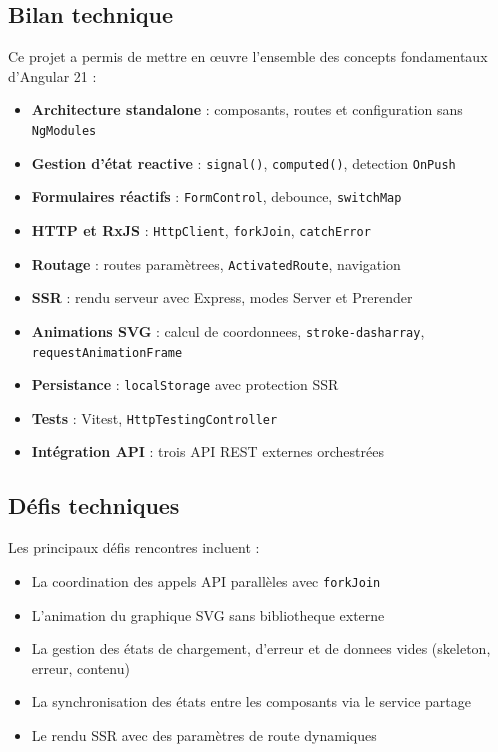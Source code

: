 \documentclass[12pt,a4paper]{article}
\begin{document}
\subsection{Bilan technique}

Ce projet a permis de mettre en œuvre l'ensemble des concepts fondamentaux d'Angular 21 :

\begin{itemize}[nosep]
    \item \textbf{Architecture standalone} : composants, routes et configuration sans \texttt{NgModules}
    \item \textbf{Gestion d'état reactive} : \texttt{signal()}, \texttt{computed()}, detection \texttt{OnPush}
    \item \textbf{Formulaires réactifs} : \texttt{FormControl}, debounce, \texttt{switchMap}
    \item \textbf{HTTP et RxJS} : \texttt{HttpClient}, \texttt{forkJoin}, \texttt{catchError}
    \item \textbf{Routage} : routes paramètrees, \texttt{ActivatedRoute}, navigation
    \item \textbf{SSR} : rendu serveur avec Express, modes Server et Prerender
    \item \textbf{Animations SVG} : calcul de coordonnees, \texttt{stroke-dasharray}, \texttt{requestAnimationFrame}
    \item \textbf{Persistance} : \texttt{localStorage} avec protection SSR
    \item \textbf{Tests} : Vitest, \texttt{HttpTestingController}
    \item \textbf{Intégration API} : trois API REST externes orchestrées
\end{itemize}

\subsection{Défis techniques}

Les principaux défis rencontres incluent :
\begin{itemize}[nosep]
    \item La coordination des appels API parallèles avec \texttt{forkJoin}
    \item L'animation du graphique SVG sans bibliotheque externe
    \item La gestion des états de chargement, d'erreur et de donnees vides (skeleton, erreur, contenu)
    \item La synchronisation des états entre les composants via le service partage
    \item Le rendu SSR avec des paramètres de route dynamiques
\end{itemize}
\end{document}
